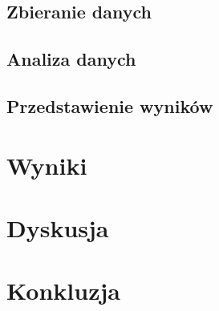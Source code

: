 \documentclass[12pt]{article}
\begin{document}
\subsection{Zbieranie danych}
\subsection{Analiza danych}
\subsection{Przedstawienie wyników}

\section{Wyniki}


\section{Dyskusja}


\section{Konkluzja}




\end{document}
